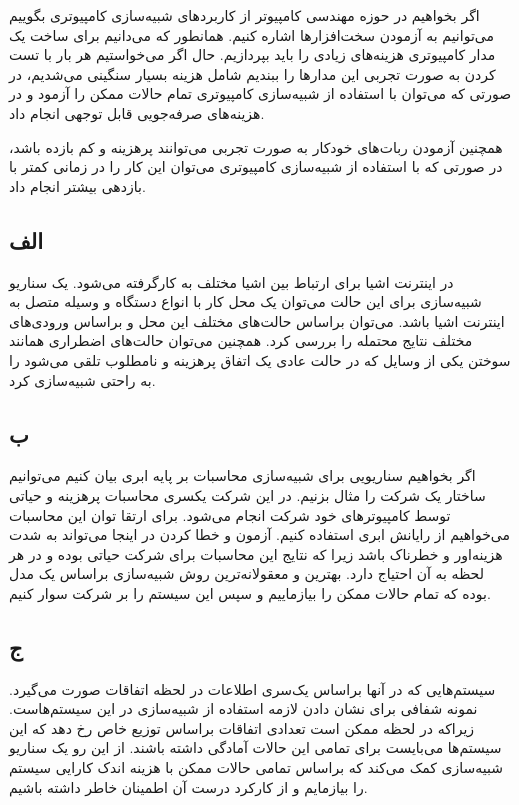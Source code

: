 اگر بخواهیم در حوزه مهندسی کامپیوتر از کاربردهای شبیه‌سازی کامپیوتری بگوییم می‌توانیم به آزمودن سخت‌افزارها اشاره کنیم. همانطور که می‌دانیم برای ساخت یک مدار کامپیوتری هزینه‌های زیادی را باید بپردازیم. حال اگر می‌خواستیم هر بار با تست کردن به صورت تجربی این مدارها را ببندیم شامل هزینه بسیار سنگینی می‌شدیم، در صورتی که می‌توان با استفاده از شبیه‌سازی کامپیوتری تمام حالات ممکن را آزمود و در هزینه‌های صرفه‌جویی قابل توجهی انجام داد.

همچنین آزمودن ربات‌های خودکار به صورت تجربی می‌توانند پرهزینه و کم بازده باشد، در صورتی که با استفاده از شبیه‌سازی کامپیوتری می‌توان این کار را در زمانی کمتر با بازدهی بیشتر انجام داد.

\subsection*{الف}
در اینترنت اشیا برای ارتباط بین اشیا مختلف به کارگرفته می‌شود. یک سناریو شبیه‌سازی برای این حالت می‌توان یک محل کار با انواع دستگاه و وسیله متصل به اینترنت اشیا باشد. می‌توان براساس حالت‌های مختلف این محل و براساس ورودی‌های مختلف نتایج محتمله را بررسی کرد. همچنین می‌توان حالت‌های اضطراری همانند سوختن یکی از وسایل که در حالت عادی یک اتفاق پرهزینه و نامطلوب تلقی می‌شود را به راحتی شبیه‌سازی کرد.

\subsection*{ب}
اگر بخواهیم سناریویی برای شبیه‌سازی محاسبات بر پایه ابری بیان کنیم می‌توانیم ساختار یک شرکت را مثال بزنیم. در این شرکت یکسری محاسبات پرهزینه و حیاتی توسط کامپیوترهای خود شرکت انجام می‌شود. برای ارتقا توان این محاسبات می‌خواهیم از رایانش ابری استفاده کنیم. آزمون و خطا کردن در اینجا می‌تواند به شدت هزینه‌اور و خطرناک باشد زیرا که نتایج این محاسبات برای شرکت حیاتی بوده و در هر لحظه به آن احتیاج دارد. بهترین و معقولانه‌ترین روش شبیه‌سازی براساس یک مدل بوده که تمام حالات ممکن را بیازماییم و سپس این سیستم را بر شرکت سوار کنیم.

\subsection*{ج}
سیستم‌هایی که در آنها براساس یک‌سری اطلاعات در لحظه اتفاقات صورت می‌گیرد. نمونه شفافی برای نشان دادن لازمه استفاده از شبیه‌سازی در این سیستم‌هاست. زیراکه در لحظه ممکن است تعدادی اتفاقات براساس توزیع خاص رخ دهد که این سیستم‌ها می‌بایست برای تمامی این حالات آمادگی داشته باشند. از این رو یک سناریو شبیه‌سازی کمک می‌کند که براساس تمامی حالات ممکن با هزینه اندک کارایی سیستم را بیازمایم و از کارکرد درست آن اطمینان خاطر داشته باشیم.